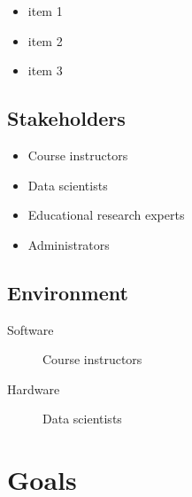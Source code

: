 \documentclass{article}
\begin{document}
\begin{itemize}
    \item item 1
    \item item 2
    \item item 3
\end{itemize}


\subsection{Stakeholders}

\begin{itemize}
    \item Course instructors
    \item Data scientists
    \item Educational research experts
    \item Administrators
\end{itemize}

\subsection{Environment}

\begin{description}
    \item [Software] Course instructors
    \item [Hardware] Data scientists
\end{description}


\section{Goals}
\end{document}
